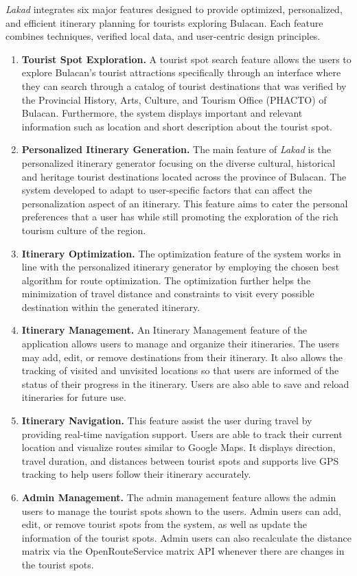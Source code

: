 \textit{Lakad} integrates six major features designed to provide optimized, personalized, and efficient itinerary planning for tourists exploring Bulacan. Each feature combines techniques, verified local data, and user-centric design principles.
\begin{enumerate}
	\item \textbf{Tourist Spot Exploration.}
		A tourist spot search feature allows the users to explore Bulacan’s tourist attractions specifically through an interface where they can search through a catalog of  tourist destinations that was verified by the Provincial History, Arts, Culture, and Tourism Office (PHACTO) of Bulacan. Furthermore, the system displays important and relevant information such as location and short description about the tourist spot.

	\item \textbf{Personalized Itinerary Generation.}
		The main feature of \textit{Lakad} is the personalized itinerary generator focusing on the diverse cultural, historical and heritage tourist destinations located across the province of Bulacan. The system developed to adapt to user-specific factors that can affect the personalization aspect of an itinerary. This feature aims to cater the personal preferences that a user has while still promoting the exploration of the rich tourism culture of the region.

	\item \textbf{Itinerary Optimization.}
		The optimization feature of the system works in line with the personalized itinerary generator by employing the chosen best algorithm for route optimization. The optimization further helps the minimization of travel distance and constraints to visit every possible destination within the generated itinerary.

	\item \textbf{Itinerary Management.}
		An Itinerary Management feature of the application allows users to manage and organize their itineraries. The users may add, edit, or remove destinations from their itinerary. It also allows the tracking of visited and unvisited locations so that users are informed of the status of their progress in the itinerary. Users are also able to save and reload itineraries for future use.

	\item \textbf{Itinerary Navigation.}
		This feature assist the user during travel by providing real-time navigation support. Users are able to track their current location and visualize routes similar to Google Maps. It displays direction, travel duration, and distances between tourist spots and supports live GPS tracking to help users follow their itinerary accurately.

	\item \textbf{Admin Management.}
		The admin management feature allows the admin users to manage the tourist spots shown to the users. Admin users can add, edit, or remove tourist spots from the system, as well as update the information of the tourist spots. Admin users can also recalculate the distance matrix via the OpenRouteService matrix API whenever there are changes in the tourist spots.
\end{enumerate}

